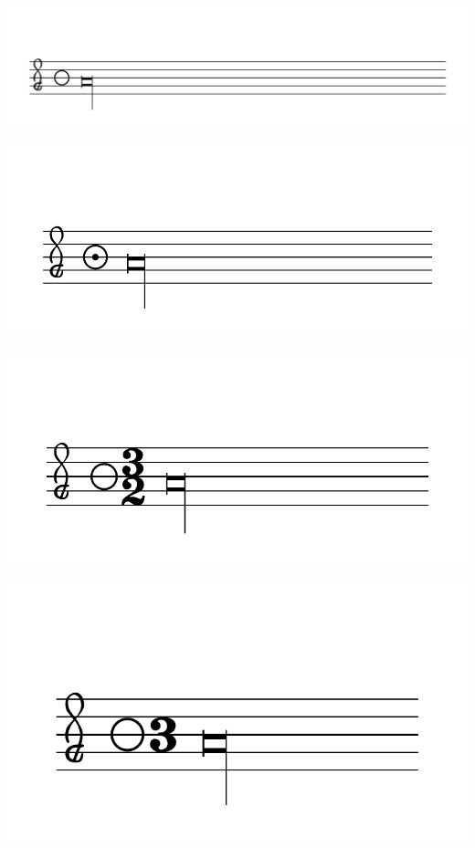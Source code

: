 \documentclass{article}
\begin{document}
        \includegraphics[scale=0.5]{figures_tests/pdf/smens/perfectmeter6.pdf}

        \includegraphics[scale=0.5]{figures_tests/pdf/smens/perfectmeter7.pdf}

        \includegraphics[scale=0.5]{figures_tests/pdf/smens/perfectmeter8.pdf}

        \includegraphics[scale=0.5]{figures_tests/pdf/smens/perfectmeter9.pdf}
\end{document}

